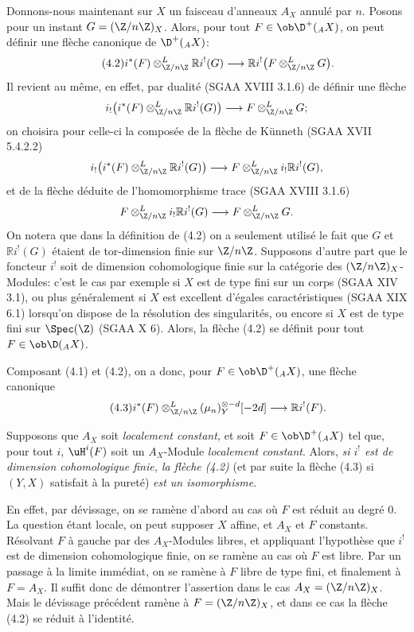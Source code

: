 Donnons-nous maintenant sur $X$ un faisceau d'anneaux $A_X$ annulé par $n$. Posons pour un instant $G=(\Z/n\Z)_X$. Alors, pour tout $F\in\ob\D^+({}_A X)$, on peut définir une flèche canonique de $\D^+({}_A X)$:
\begin{equation}\tag{4.2}
        i^*(F)\otimes^L_{\Z/n\Z} \mathbb{R} i^!(G)\longrightarrow \mathbb{R} i^!\bigl(F\otimes^L_{\Z/n\Z}G\bigr).
\end{equation}
Il revient au même, en effet, par dualité (SGAA XVIII 3.1.6) de définir une flèche
\[
        i_!\bigl(i^*(F)\otimes^L_{\Z/n\Z}\mathbb{R} i^!(G)\bigr)\longrightarrow F\otimes^L_{\Z/n\Z}G;
\]
on choisira pour celle-ci la composée de la flèche de Künneth (SGAA XVII 5.4.2.2)
\[
        i_!\bigl(i^*(F)\otimes^L_{\Z/n\Z}\mathbb{R} i^!(G)\bigr)\longrightarrow F\otimes^L_{\Z/n\Z}i_!\mathbb{R} i^!(G),
\]
et de la flèche déduite de l'homomorphisme trace (SGAA XVIII 3.1.6)
\[
        F\otimes^L_{\Z/n\Z}i_!\mathbb{R} i^!(G)\longrightarrow F\otimes^L_{\Z/n\Z}G.
\]
On notera que dans la définition de (4.2) on a seulement utilisé le fait que $G$ et $\mathbb{R} i^!(G)$ étaient de tor-dimension finie sur $\Z/n\Z$. Supposons d'autre part que le foncteur $i^!$ soit de dimension cohomologique finie sur la catégorie des $(\Z/n\Z)_X$-Modules: c'est le cas par exemple si $X$ est de type fini sur un corps (SGAA XIV 3.1), ou plus généralement si $X$ est excellent d'égales caractéristiques (SGAA XIX 6.1) lorsqu'on dispose de la résolution des singularités, ou encore si $X$ est de type fini sur $\Spec(\Z)$ (SGAA X 6). Alors, la flèche (4.2) se définit pour tout $F\in\ob\D({}_A X)$.

Composant (4.1) et (4.2), on a donc, pour $F\in\ob\D^+({}_A X)$, une flèche canonique
\begin{equation}\tag{4.3}
        i^*(F)\otimes^L_{\Z/n\Z}(\mu_n)_Y^{\otimes -d}[-2d]\longrightarrow \mathbb{R} i^!(F).
\end{equation}

Supposons que $A_X$ soit \emph{localement constant,} et soit $F\in\ob\D^+({}_A X)$ tel que, pour tout $i$, $\uH^i(F)$ soit un $A_X$-Module \emph{localement constant}. Alors, \emph{si $i^!$ est de dimension cohomologique finie, la flèche (4.2)} (et par suite la flèche (4.3) si $(Y,X)$ satisfait à la pureté) \emph{est un isomorphisme}.

En effet, par dévissage, on se ramène d'abord au cas où $F$ est réduit au degré $0$. La question étant locale, on peut supposer $X$ affine, et $A_X$ et $F$ constants. Résolvant $F$ à gauche par des $A_X$-Modules libres, et appliquant l'hypothèse que $i^!$ est de dimension cohomologique finie, on se ramène au cas où $F$ est libre. Par un passage à la limite immédiat, on se ramène à $F$ libre de type fini, et finalement à $F=A_X$. Il suffit donc de démontrer l'assertion dans le cas $A_X=(\Z/n\Z)_X$. Mais le dévissage précédent ramène à $F=(\Z/n\Z)_X$, et dans ce cas la flèche (4.2) se réduit à l'identité.

